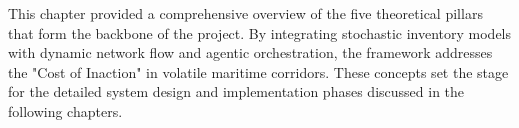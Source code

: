 \vspace{0.75cm}

This chapter provided a comprehensive overview of the five theoretical pillars that form the backbone of the project. By integrating stochastic inventory models with dynamic network flow and agentic orchestration, the framework addresses the "Cost of Inaction" in volatile maritime corridors. These concepts set the stage for the detailed system design and implementation phases discussed in the following chapters.
